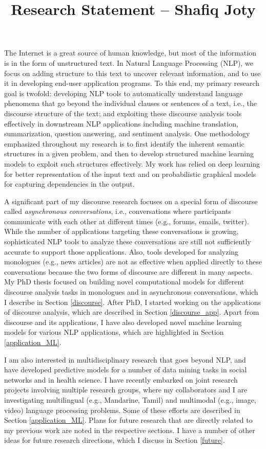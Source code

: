 \documentclass{article} %
\title{Research Statement -- Shafiq Joty}
\begin{document}
\maketitle

The Internet is a great source of human knowledge, but most of the information is in the form of unstructured text. In Natural Language Processing (NLP), we focus on adding structure to this text to uncover relevant information, and to use it in developing end-user application programs. To this end, my primary research goal is twofold: \Ni  developing NLP tools to automatically understand language phenomena that go beyond the individual clauses or sentences of a text, i.e., the discourse structure of the text; and \Nii exploiting these discourse analysis tools effectively in downstream NLP applications including machine translation, summarization, question answering, and sentiment analysis. One methodology emphasized throughout my research is to first identify the inherent semantic structures in a given problem, and then to develop structured machine learning models to exploit such structures effectively. My work has relied on deep learning for better representation of the input text and on probabilistic graphical models for capturing dependencies in the output.     
 

A significant part of my discourse research focuses on a special form of discourse called \emph{asynchronous conversations}, i.e., conversations where participants communicate with each other at different times (e.g., forums, emails, twitter). While the number of applications targeting these conversations is growing, sophisticated NLP tools to analyze these conversations are still not sufficiently accurate to support those applications. Also, tools developed for analyzing monologues (e.g., news articles) are not as effective when applied directly to these conversations because the two forms of discourse are different in many aspects. My PhD thesis focused on building novel computational models for different discourse analysis tasks in monologues and in asynchronous conversations, which I describe in Section \ref{discourse}. After PhD, I started working on the applications of discourse analysis, which are described in Section \ref{discourse_app}. Apart from discourse and its applications, I have also developed novel machine learning models for various NLP applications, which are highlighted in Section \ref{application_ML}. 

I am also interested in multidisciplinary research that goes beyond NLP, and have developed predictive models for a number of data mining tasks in social networks and in health science. I have recently embarked on joint research projects involving multiple research groups, where my collaborators and I are investigating multilingual (e.g., Mandarine, Tamil) and multimodal (e.g., image, video) language processing problems. Some of these efforts are described in Section \ref{application_ML}. Plans for future research that are directly related to my previous work are noted in the respective sections. I have a number of other ideas for future research directions, which I discuss in Section \ref{future}.       
\end{document}
